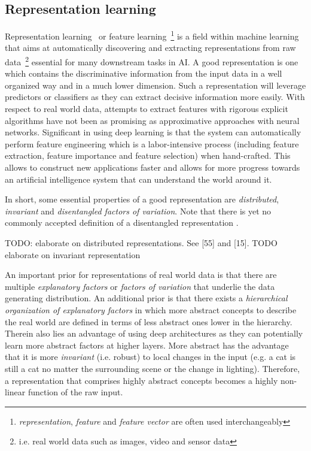 \documentclass[12pt,a4paper]{article}
\begin{document}
\subsection{Representation learning}
Representation learning~\cite{ReprLearning} or feature learning~\footnote{\textit{representation}, \textit{feature} and \textit{feature vector} are often used interchangeably} is a field within machine learning that aims at automatically discovering and extracting representations from raw data~\footnote{i.e. real world data such as images, video and sensor data} essential for many downstream tasks in AI. A good representation is one which contains the discriminative information from the input data in a well organized way and in a much lower dimension. Such a representation will leverage predictors or classifiers as they can extract decisive information more easily. With respect to real world data, attempts to extract features with rigorous explicit algorithms have not been as promising as approximative approaches with neural networks. Significant in using deep learning is that the system can automatically perform feature engineering which is a labor-intensive process (including feature extraction, feature importance and feature selection) when hand-crafted. This allows to construct new applications faster and allows for more progress towards an artificial intelligence system that can understand the world around it.  

In short, some essential properties of a good representation are \textit{distributed}, \textit{invariant} and \textit{disentangled factors of variation}. Note that there is yet no commonly accepted definition of a disentangled representation \cite{SpatialBDecoder}.

TODO: elaborate on distributed representations. See [55] and [15].
TODO elaborate on invariant representation

An important prior for representations of real world data is that there are multiple \textit{explanatory factors} or \textit{factors of variation} that underlie the data generating distribution. An additional prior is that there exists a \textit{hierarchical organization of explanatory factors} in which more abstract concepts to describe the real world are defined in terms of less abstract ones lower in the hierarchy. Therein also lies an advantage of using deep architectures as they can potentially learn more abstract factors at higher layers. More abstract has the advantage that it is more \textit{invariant} (i.e. robust) to local changes in the input (e.g. a cat is still a cat no matter the surrounding scene or the change in lighting). Therefore, a representation that comprises highly abstract concepts becomes a highly non-linear function of the raw input.
\end{document}
